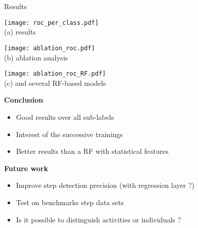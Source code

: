 \begin{frame}{Results}{}
\renewcommand{\ratiob}{0.98}
    \begin{minipage}{\linewidth}
        \centering
        \begin{minipage}[t]{0.33\linewidth}
            \centering
            \texttt{[image: roc\_per\_class.pdf]}\\
            {\small(a)\; \algo results}
        \end{minipage}\hfill
        \begin{minipage}[t]{0.33\linewidth}
            \centering
            \texttt{[image: ablation\_roc.pdf]}\\
            {\small(b)\; \algo ablation analysis}
        \end{minipage}\hfill
        \begin{minipage}[t]{0.33\linewidth}
            \centering
            \texttt{[image: ablation\_roc\_RF.pdf]}\\
            {\small(c)\; \algo and several RF-based models}
        \end{minipage}
    \end{minipage}

\centering
\begin{minipage}{0.8\linewidth}
\centering\textbf{Conclusion}
\begin{itemize}
    \item Good results over all sub-labels
    \item Interest of the successive trainings
    \item Better results than a RF with statistical features
\end{itemize}
\centering\textbf{Future work}
\begin{itemize}
    \item Improve step detection precision (with regression layer ?)
    \item Test on benchmarks step data sets
    \item Is it possible to distinguish activities or individuals ?
\end{itemize}
\end{minipage}

\end{frame}

\subsection{}


